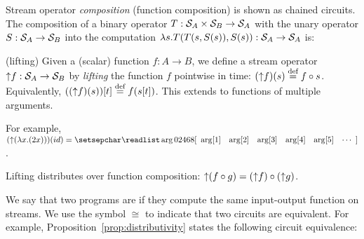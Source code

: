 Stream operator \emph{composition} (function composition) is shown as chained circuits.
The composition of a binary operator $T: \mathcal{S}_{A} \times \mathcal{S}_{B} \to \mathcal{S}_{A}$ with the 
unary operator $S: \mathcal{S}_{A} \to \mathcal{S}_{B}$ into the computation 
$\lambda s. T(T(s,S(s)),S(s)) : \mathcal{S}_{A}\to\mathcal{S}_{A}$ 
is:

\begin{center}
\end{center}


\begin{definition}(lifting)
Given a (scalar) function $f: A \to B$,
we define a stream operator ${\uparrow}f :\mathcal{S}_{A} \to \mathcal{S}_{B}$ 
by \emph{lifting} the function $f$ pointwise in time: $({\uparrow}f)(s) \stackrel{\textrm{\scriptsize def}}{=} f \circ s$.
Equivalently, $(({\uparrow}f)(s))[t] \stackrel{\textrm{\scriptsize def}}{=} f(s[t])$.
This extends to functions of multiple arguments.
\end{definition}

\ifstreamexamples
For example, $(\lift{(\lambda x.(2x))})(id) = \sv{0 2 4 6 8}$.
\fi

\begin{proposition}[distributivity]\label{prop:distributivity}
Lifting distributes over function composition:
${\uparrow}(f \circ g) = ({\uparrow}f) \circ ({\uparrow}g)$.
\end{proposition}
\begin{comment}
\begin{proof}
This is easily proved by using associativity of function composition:
$\forall s . (\lift{(f \circ g)})(s) = (f \circ g) \circ s =
f \circ (g \circ s) = f \circ (\lift{g})(s) = (\lift{f})((\lift{g})(s)) = 
(\lift{f} \circ \lift{g})(s).$
\end{proof}
\end{comment}

We say that two \dbsp programs are  if they compute the same
input-output function on streams.
We use the symbol $\cong$ to indicate that two circuits are 
equivalent.  For example, Proposition~\ref{prop:distributivity}
states the following circuit equivalence:

